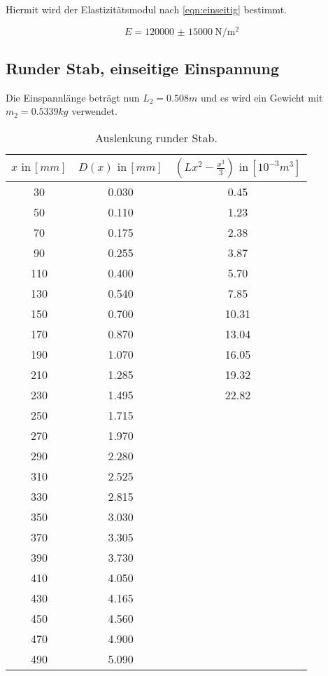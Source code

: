 Hiermit wird der Elastizitätsmodul nach \ref{eqn:einseitig} bestimmt.

\begin{equation*}
  E = \SI{120000(15000)}{\newton\per\square\meter}
\end{equation*}






\subsection{Runder Stab, einseitige Einspannung}
Die Einspannlänge beträgt nun $L_2 = 0.508m$ und es wird ein Gewicht
mit $m_2 = 0.5339 kg $ verwendet.

\begin{table}[h]
  \centering
  \label{tab:lit3}
  \begin{tabular}{ c c c }
    \toprule
    $x \,\, \text{in} \, [mm]$
   &{$D(x) \,\, \text{in} \, [mm]$}
   &{$(Lx^2- \frac{x^3}{3}) \,\, \text{in} \, [10^{-3}m^3]$} \\

    \midrule
    30 & 0.030 & 0.45\\
    50 & 0.110 & 1.23\\
    70 & 0.175 & 2.38\\
    90 & 0.255 & 3.87\\
    110& 0.400 & 5.70\\
    130& 0.540 & 7.85\\
    150& 0.700 &10.31\\
    170& 0.870 &13.04\\
    190& 1.070 &16.05\\
    210& 1.285 &19.32\\
    230& 1.495 &22.82\\
    250& 1.715 &\\
    270& 1.970 &\\
    290& 2.280 &\\
    310& 2.525 &\\
    330& 2.815 &\\
    350& 3.030 &\\
    370& 3.305 &\\
    390& 3.730 &\\
    410& 4.050 &\\
    430& 4.165 &\\
    450& 4.560 &\\
    470& 4.900 &\\
    490& 5.090 &\\

    \bottomrule
  \end{tabular}
  \caption{Auslenkung runder Stab.}
\end{table}

